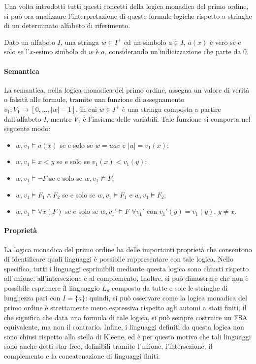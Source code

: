 Una volta introdotti tutti questi concetti della logica monadica del primo ordine, si può ora analizzare l'interpretazione di queste formule logiche rispetto a stringhe di un determinato alfabeto di riferimento.

Dato un alfabeto \(I\), una stringa \(w\in I^+\) ed un simbolo \(a\in I\), \(a(x)\) è vero se e solo se l'\(x\)-esimo simbolo di \(w\) è \(a\), considerando un'indicizzazione che parte da 0.

\paragraph*{Semantica} La semantica, nella logica monadica del primo ordine, assegna un valore di verità o falsità alle formule, tramite una funzione di assegnamento \(v_1 : V_1\to [0,...,|w|-1]\), in cui \(w\in I^+\) è una stringa composta a partire dall'alfabeto \(I\), mentre \(V_1\) è l'insieme delle variabili. Tale funzione si comporta nel seguente modo:
\begin{itemize}
  \item \(w, v_1 \vDash a(x)\) se e solo se \(w = uav\) e \(|u| = v_1(x)\);
  \item \(w, v_1 \vDash x<y\) se e solo se \(v_1(x) < v_1(y)\);
  \item \(w, v_1 \vDash \lnot F\) se e solo se \(w, v_1 \nvDash F\);
  \item \(w, v_1 \vDash F_1 \wedge F_2\) se e solo se \(w,v_1 \vDash F_1\) e \(w,v_1\vDash F_2\);
  \item \(w, v_1 \vDash \forall x(F)\) se e solo se \(w, v_1' \vDash F\,\, \forall v_1'\) con \(v_1'(y) = v_1(y),\, y\neq x\).
\end{itemize}

\paragraph*{Proprietà} La logica monadica del primo ordine ha delle importanti proprietà che consentono di identificare quali linguaggi è possibile rappresentare con tale logica. Nello specifico, tutti i linguaggi esprimibili mediante questa logica sono chiusti rispetto all'unione, all'intersezione e al complemento, Inoltre, si può dimostrare che non è possibile esprimere il linguaggio \(L_p\) composto da tutte e sole le stringhe di lunghezza pari con \(I = \{a\}\): quindi, si può osservare come la logica monadica del primo ordine è strettamente meno espressiva rispetto agli automi a stati finiti, il che significa che data una formula di tale logica, si può sempre costruire un FSA equivalente, ma non il contrario. Infine, i linguaggi definiti da questa logica non sono chiusi rispetto alla stella di Kleene, ed è per questo motivo che tali linguaggi sono anche detti star-free, definibili tramite l'unione, l'intersezione, il complemento e la concatenazione di linguaggi finiti. 

